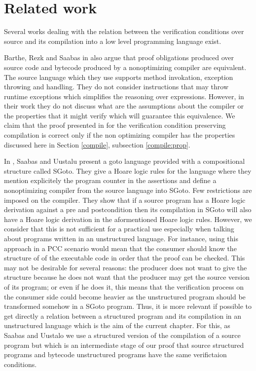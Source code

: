 \section{Related work}\label{pog:relWork}


Several works dealing with the relation between the 
verification conditions over source and its compilation into a low  level  programming  language exist.

Barthe, Rezk and Saabas in \cite{gta05:fast} also argue that proof obligations produced
over source code and
bytecode produced by a nonoptimizing compiler   are equivalent.
The source language which they use supports method invokation, exception throwing and handling. 
They do not consider instructions that may throw runtime exceptions which simplifies the reasoning over expressions. 
 However, in their work they do not discuss  what are the  assumptions about the compiler 
or the  properties that it might verify  which will guarantee this equivalence.
 We claim that the proof presented in \cite{gta05:fast} for
 the verification condition preserving compilation is correct only if the non optimizing 
 compiler has the properties discussed here in Section \ref{compile}, subsection \ref{compile:prop}.


In \cite{SU05CNS}, Saabas and Uustalu present a goto language provided with a compositional structure called SGoto.
They give a Hoare logic rules for the language where they mention explicitely the program counter in the assertions and define a nonoptimizing 
compiler from the source language into SGoto. Few  restrictions are imposed on the compiler. 
They show that if a source program has a Hoare logic derivation
 against a pre and postcondition then its compilation in SGoto will also have a Hoare
 logic derivation in the aformentioned Hoare logic rules. However, we consider that this is not sufficient for a practical use especially when 
talking about programs written in an unstructured language. 
For instance, using this approach in a PCC scenario would mean that the consumer should know the structure of 
of the  executable code in order that the proof can be checked. This may not be desirable for several reasons:
the producer does not want to  give the structure because he does not want that the producer may get the source version of its program; 
or even if he does it, this means that the verification process on the consumer side could become heavier as the unstructured program
 should be transformed somehow in a SGoto program.
 Thus, it is more relevant if possible to get directly  a relation between a structured program 
and its compilation in an  unstructured  language which is the aim of the current chapter.
 For this, as Saabas and Uustalo we use a  structured version of the compilation of a source program 
but which is an intermediate stage of our proof that source structured programs and bytecode unstructured 
programs have the same verifictaion conditions.

